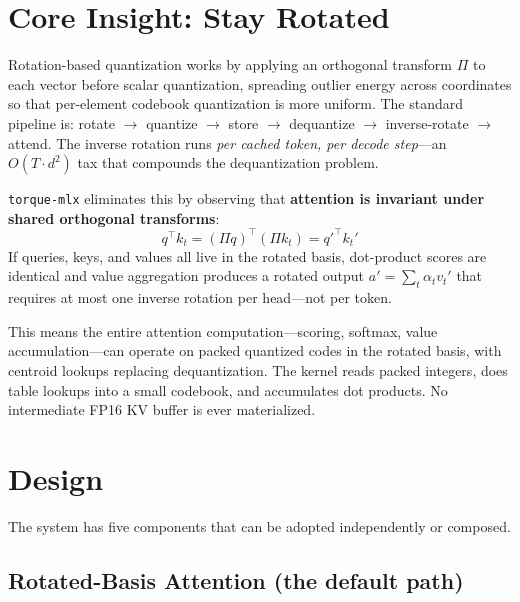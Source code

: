\documentclass[nobib]{tufte-handout}
\begin{document}
\section{Core Insight: Stay Rotated}

Rotation-based quantization works by applying an orthogonal transform $\Pi$ to each vector before scalar quantization, spreading outlier energy across coordinates so that per-element codebook quantization is more uniform. The standard pipeline is: rotate $\to$ quantize $\to$ store $\to$ dequantize $\to$ inverse-rotate $\to$ attend. The inverse rotation runs \emph{per cached token, per decode step}---an $O(T \cdot d^2)$ tax that compounds the dequantization problem.

\texttt{torque-mlx} eliminates this by observing that \textbf{attention is invariant under shared orthogonal transforms}:
\[
  q^\top k_t = (\Pi q)^\top (\Pi k_t) = q'^\top k_t'
\]
If queries, keys, and values all live in the rotated basis, dot-product scores are identical and value aggregation produces a rotated output $a' = \sum_t \alpha_t v_t'$ that requires at most one inverse rotation per head---not per token.

This means the entire attention computation---scoring, softmax, value accumulation---can operate on packed quantized codes in the rotated basis, with centroid lookups replacing dequantization. The kernel reads packed integers, does table lookups into a small codebook, and accumulates dot products. No intermediate FP16 KV buffer is ever materialized.


\section{Design}

The system has five components that can be adopted independently or composed.

\subsection{Rotated-Basis Attention (the default path)}
\end{document}

